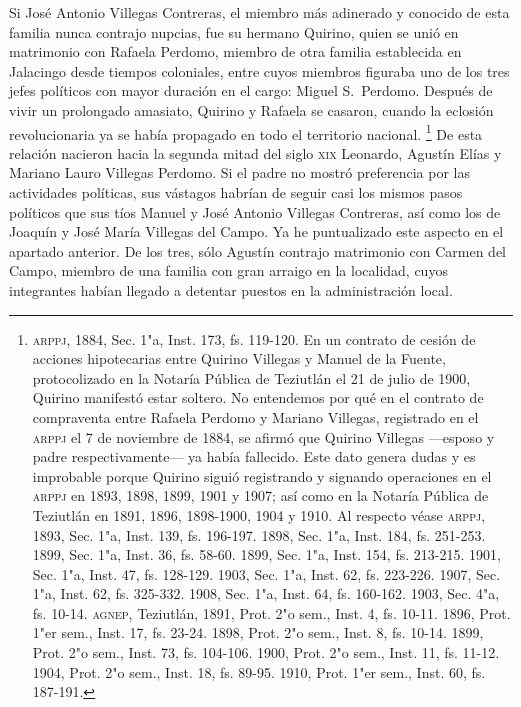 \documentclass[14pt,twoside,final]{extbook} %
\let\oldfootnote\footnote
\renewcommand\footnote[1]{%
\oldfootnote{\hspace{1mm}#1}}
\begin{document}
Si José Antonio Villegas Contreras, el miembro más adinerado y conocido de esta familia nunca contrajo nupcias, fue su hermano Quirino, quien se unió en matrimonio con Rafaela Perdomo, miembro de otra familia establecida en Jalacingo desde tiempos coloniales, entre cuyos miembros figuraba uno de los tres jefes políticos con mayor duración en el cargo: Miguel S.~Perdomo. Después de vivir un prolongado amasiato, Quirino y Rafaela se casaron, cuando la eclosión revolucionaria ya se había
propagado en todo el territorio nacional.\footnote{\textsc{arppj}, 1884, Sec. 1"a, Inst. 173, fs. 119-120. En un contrato de cesión de acciones hipotecarias entre Quirino Villegas y Manuel de la Fuente, protocolizado en la Notaría Pública de Teziutlán el 21 de julio de 1900, Quirino manifestó estar soltero. No entendemos por qué en el contrato de compraventa entre Rafaela Perdomo y Mariano Villegas, registrado en el \textsc{arppj} el 7 de noviembre de 1884, se afirmó que Quirino Villegas ---esposo y padre respectivamente--- ya había fallecido. Este dato genera dudas y es improbable porque Quirino siguió registrando y signando operaciones en el \textsc{arppj} en 1893, 1898, 1899, 1901 y 1907; así como en la Notaría Pública de Teziutlán en 1891, 1896, 1898-1900, 1904 y 1910. Al respecto véase \textsc{arppj}, 1893, Sec. 1"a, Inst. 139, fs. 196-197. 1898, Sec. 1"a, Inst. 184, fs. 251-253. 1899, Sec. 1"a, Inst. 36, fs. 58-60. 1899, Sec. 1"a, Inst. 154, fs. 213-215. 1901, Sec. 1"a, Inst. 47, fs. 128-129. 1903, Sec. 1"a, Inst. 62, fs. 223-226. 1907, Sec. 1"a, Inst. 62, fs. 325-332. 1908, Sec. 1"a, Inst. 64, fs. 160-162. 1903, Sec. 4"a, fs. 10-14. \textsc{agnep}, Teziutlán, 1891, Prot. 2"o sem., Inst. 4, fs. 10-11. 1896, Prot. 1"er sem., Inst. 17, fs. 23-24. 1898, Prot. 2"o sem., Inst. 8, fs. 10-14. 1899, Prot. 2"o sem., Inst. 73, fs. 104-106. 1900, Prot. 2"o sem., Inst. 11, fs. 11-12. 1904, Prot. 2"o sem., Inst. 18, fs. 89-95. 1910, Prot. 1"er sem., Inst. 60, fs. 187-191.} De esta relación nacieron hacia la segunda mitad del siglo \textsc{xix} Leonardo, Agustín Elías y Mariano Lauro Villegas Perdomo. Si el padre no mostró preferencia por las actividades políticas, sus vástagos habrían de seguir casi los mismos pasos políticos que sus tíos Manuel y José Antonio Villegas Contreras, así como los de Joaquín y José María Villegas del Campo. Ya he puntualizado este aspecto en el apartado anterior. De los tres, sólo Agustín contrajo matrimonio con Carmen del Campo, miembro de una familia con gran arraigo en la localidad, cuyos integrantes habían llegado a detentar puestos en la administración local.
\end{document}

